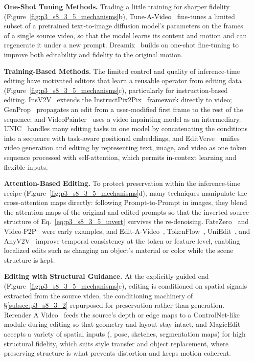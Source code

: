 \noindent\textbf{One-Shot Tuning Methods.} Trading a little training for sharper fidelity (Figure~\ref{fig:p3_s8_3_5_mechanisms}b), Tune-A-Video~\cite{wu2023tune} fine-tunes a limited subset of a pretrained text-to-image diffusion model's parameters on the frames of a single source video, so that the model learns its content and motion and can regenerate it under a new prompt. Dreamix~\cite{molad2023dreamixvideodiffusionmodels} builds on one-shot fine-tuning to improve both editability and fidelity to the original motion.

\noindent\textbf{Training-Based Methods.} The limited control and quality of inference-time editing have motivated editors that learn a reusable operator from editing data (Figure~\ref{fig:p3_s8_3_5_mechanisms}c), particularly for instruction-based editing. InsV2V~\cite{cheng2023consistentvideotovideotransferusing} extends the InstructPix2Pix~\cite{brooks2023instructpix2pixlearningfollowimage} framework directly to video; GenProp~\cite{Liu_2025_CVPR} propagates an edit from a user-modified first frame to the rest of the sequence; and VideoPainter~\cite{videopainter} uses a video inpainting model as an intermediary. UNIC~\cite{ye2025unicunifiedincontextvideo} handles many editing tasks in one model by concatenating the conditions into a sequence with task-aware positional embeddings, and EditVerse~\cite{ju2025editverseunifyingimagevideo} unifies video generation and editing by representing text, image, and video as one token sequence processed with self-attention, which permits in-context learning and flexible inputs.

\noindent\textbf{Attention-Based Editing.} To protect preservation within the inference-time recipe (Figure~\ref{fig:p3_s8_3_5_mechanisms}d), many techniques manipulate the cross-attention maps directly: following Prompt-to-Prompt in images, they blend the attention maps of the original and edited prompts so that the inverted source structure of Eq.~\eqref{eq:p3_s8_3_5_invert} survives the re-denoising. FateZero~\cite{qi2023fatezerofusingattentionszeroshot} and Video-P2P~\cite{liu2023videop2p} were early examples, and Edit-A-Video~\cite{shin2023editavideosinglevideoediting}, TokenFlow~\cite{tokenflow2023}, UniEdit~\cite{bai2024uniedit}, and AnyV2V~\cite{ku2024anyv2vtuningfreeframeworkvideotovideo} improve temporal consistency at the token or feature level, enabling localized edits such as changing an object's material or color while the scene structure is kept.

\noindent\textbf{Editing with Structural Guidance.} At the explicitly guided end (Figure~\ref{fig:p3_s8_3_5_mechanisms}e), editing is conditioned on spatial signals extracted from the source video, the conditioning machinery of §\ref{subsec:p3_s8_3_2} repurposed for preservation rather than generation. Rerender A Video~\cite{yang2023rerender} feeds the source's depth or edge maps to a ControlNet-like module during editing so that geometry and layout stay intact, and MagicEdit~\cite{liew2023magicedit} accepts a variety of spatial inputs (\eg, pose, sketches, segmentation maps) for high structural fidelity, which suits style transfer and object replacement, where preserving structure is what prevents distortion and keeps motion coherent.

